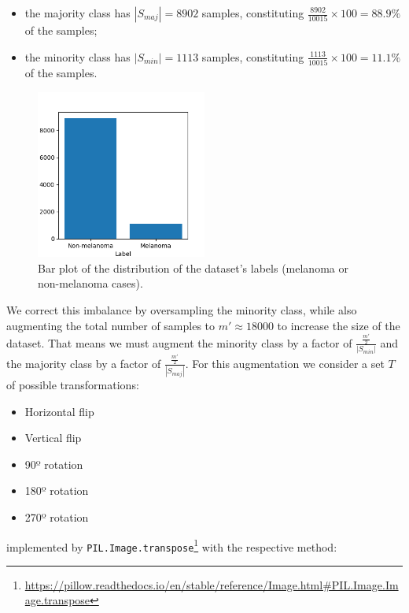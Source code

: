 \begin{itemize}
    \item the majority class has $|S_{maj}| = 8902$ samples, constituting $\frac{8902}{10015} \times 100 = 88.9\%$ of the samples;
    \item the minority class has $|S_{min}| = 1113$ samples, constituting $\frac{1113}{10015} \times 100 = 11.1\%$ of the samples.
\end{itemize}

\begin{figure}[ht]
    \centering
    \includegraphics[width=0.5\textwidth]{figs/data_barplot.png}
    \caption{Bar plot of the distribution of the dataset's labels (melanoma or non-melanoma cases).}
    \label{fig:classimbalance}
\end{figure}

We correct this imbalance by oversampling the minority class, while also augmenting the total number of samples to $m' \approx 18000$ to increase the size of the dataset. That means we must augment the minority class by a factor of $\frac{\frac{m'}{2}}{|S_{min}|}$ and the majority class by a factor of $\frac{\frac{m'}{2}}{|S_{maj}|}$. For this augmentation we consider a set $T$ of possible transformations:

\begin{itemize}
    \item Horizontal flip
    \item Vertical flip
    \item 90º rotation
    \item 180º rotation
    \item 270º rotation
\end{itemize}

implemented by \verb|PIL.Image.transpose|\footnote{\url{https://pillow.readthedocs.io/en/stable/reference/Image.html\#PIL.Image.Image.transpose}} with the respective method:

